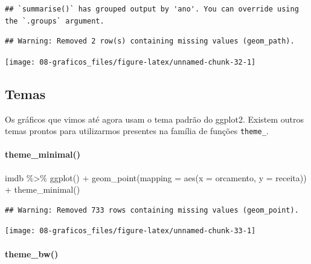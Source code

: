 \documentclass[
]{book}
\newenvironment{Shaded}{\begin{snugshade}}{\end{snugshade}}
\newcommand{\AttributeTok}[1]{\textcolor[rgb]{0.77,0.63,0.00}{#1}}
\newcommand{\FunctionTok}[1]{\textcolor[rgb]{0.00,0.00,0.00}{#1}}
\newcommand{\NormalTok}[1]{#1}
\newcommand{\SpecialCharTok}[1]{\textcolor[rgb]{0.00,0.00,0.00}{#1}}
\begin{document}
\begin{verbatim}
## `summarise()` has grouped output by 'ano'. You can override using the `.groups` argument.
\end{verbatim}

\begin{verbatim}
## Warning: Removed 2 row(s) containing missing values (geom_path).
\end{verbatim}

\begin{center}\texttt{[image: 08-graficos\_files/figure-latex/unnamed-chunk-32-1]} \end{center}

\hypertarget{temas}{%
\subsection{Temas}\label{temas}}

Os gráficos que vimos até agora usam o tema padrão do ggplot2. Existem outros temas prontos para utilizarmos presentes na família de funções \texttt{theme\_}.

\hypertarget{theme_minimal}{%
\paragraph*{theme\_minimal()}\label{theme_minimal}}

\begin{Shaded}
\begin{Highlighting}[]
\NormalTok{imdb }\SpecialCharTok{\%\textgreater{}\%} 
  \FunctionTok{ggplot}\NormalTok{() }\SpecialCharTok{+}
  \FunctionTok{geom\_point}\NormalTok{(}\AttributeTok{mapping =} \FunctionTok{aes}\NormalTok{(}\AttributeTok{x =}\NormalTok{ orcamento, }\AttributeTok{y =}\NormalTok{ receita)) }\SpecialCharTok{+}
  \FunctionTok{theme\_minimal}\NormalTok{() }
\end{Highlighting}
\end{Shaded}

\begin{verbatim}
## Warning: Removed 733 rows containing missing values (geom_point).
\end{verbatim}

\begin{center}\texttt{[image: 08-graficos\_files/figure-latex/unnamed-chunk-33-1]} \end{center}

\hypertarget{theme_bw}{%
\paragraph*{theme\_bw()}\label{theme_bw}}
\end{document}
